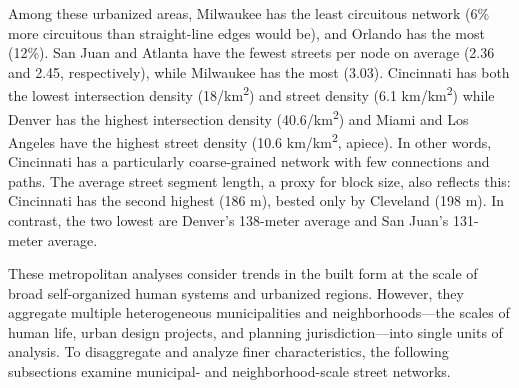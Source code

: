 \documentclass[11pt]{article}
\begin{document}
\begin{multicols}{2}
Among these urbanized areas, Milwaukee has the least circuitous network (6\% more circuitous than straight-line edges would be), and Orlando has the most (12\%). San Juan and Atlanta have the fewest streets per node on average (2.36 and 2.45, respectively), while Milwaukee has the most (3.03). Cincinnati has both the lowest intersection density (18/km\textsuperscript{2}) and street density (6.1 km/km\textsuperscript{2}) while Denver has the highest intersection density (40.6/km\textsuperscript{2}) and Miami and Los Angeles have the highest street density (10.6 km/km\textsuperscript{2}, apiece). In other words, Cincinnati has a particularly coarse-grained network with few connections and paths. The average street segment length, a proxy for block size, also reflects this: Cincinnati has the second highest (186 m), bested only by Cleveland (198 m). In contrast, the two lowest are Denver's 138-meter average and San Juan's 131-meter average.

These metropolitan analyses consider trends in the built form at the scale of broad self-organized human systems and urbanized regions. However, they aggregate multiple heterogeneous municipalities and neighborhoods---the scales of human life, urban design projects, and planning jurisdiction---into single units of analysis. To disaggregate and analyze finer characteristics, the following subsections examine municipal- and neighborhood-scale street networks.

\end{multicols}
\end{document}
